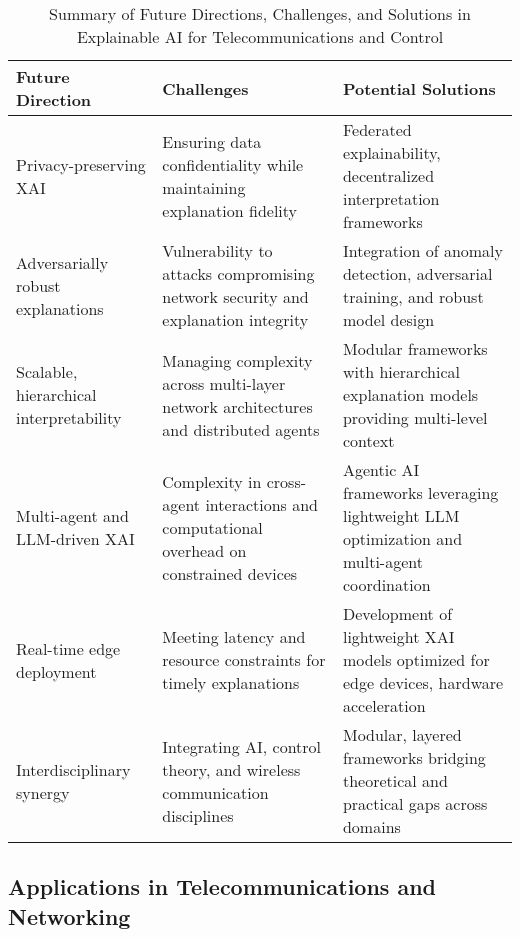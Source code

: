 \documentclass[sigconf]{acmart}
\begin{document}
\begin{table*}[htbp]
\centering
\caption{Summary of Future Directions, Challenges, and Solutions in Explainable AI for Telecommunications and Control}
\label{tab:future-directions}
\begin{adjustbox}{max width=\textwidth}
\begin{tabular}{@{}lll@{}}
\toprule
\textbf{Future Direction} & \textbf{Challenges} & \textbf{Potential Solutions} \\ \midrule
Privacy-preserving XAI & Ensuring data confidentiality while maintaining explanation fidelity & Federated explainability, decentralized interpretation frameworks~\cite{ref48} \\[6pt]
Adversarially robust explanations & Vulnerability to attacks compromising network security and explanation integrity & Integration of anomaly detection, adversarial training, and robust model design~\cite{ref50, ref54} \\[6pt]
Scalable, hierarchical interpretability & Managing complexity across multi-layer network architectures and distributed agents & Modular frameworks with hierarchical explanation models providing multi-level context~\cite{ref55} \\[6pt]
Multi-agent and LLM-driven XAI & Complexity in cross-agent interactions and computational overhead on constrained devices & Agentic AI frameworks leveraging lightweight LLM optimization and multi-agent coordination~\cite{ref55} \\[6pt]
Real-time edge deployment & Meeting latency and resource constraints for timely explanations & Development of lightweight XAI models optimized for edge devices, hardware acceleration~\cite{ref54} \\[6pt]
Interdisciplinary synergy & Integrating AI, control theory, and wireless communication disciplines & Modular, layered frameworks bridging theoretical and practical gaps across domains \\ \bottomrule
\end{tabular}
\end{adjustbox}
\end{table*}

\subsection{Applications in Telecommunications and Networking}
\end{document}
